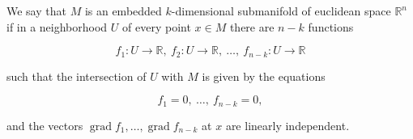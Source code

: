 We say that $M$ is an embedded $k$-dimensional submanifold of euclidean space $\mathbb{R}^n$ if in a neighborhood $U$ of every point $x \in M$ there are $n - k$ functions

$$f_1: U \to \mathbb{R},\ f_2: U \to \mathbb{R},\ \ldots,\ f_{n-k}: U \to \mathbb{R}$$

such that the intersection of $U$ with $M$ is given by the equations

$$f_1 = 0,\ \ldots,\ f_{n-k} = 0,$$

and the vectors $\operatorname{grad} f_1, \ldots, \operatorname{grad} f_{n-k}$ at $x$ are linearly independent.
